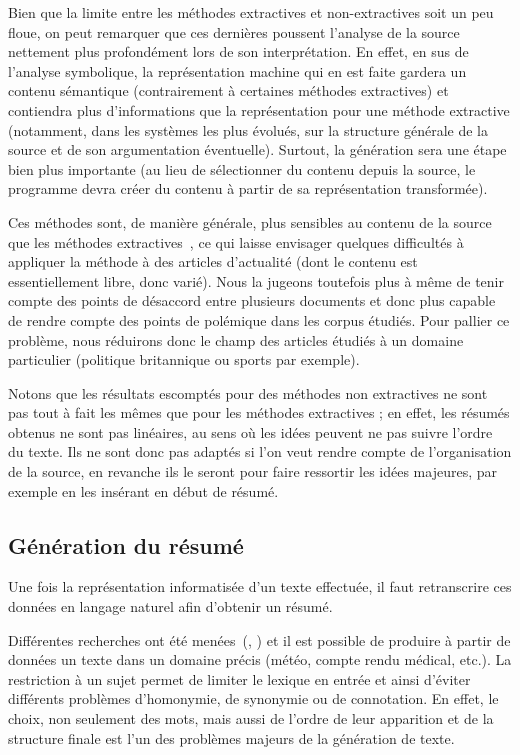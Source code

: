 \documentclass{article}           %
\begin{document}
Bien que la limite entre les méthodes extractives et non-extractives soit un peu floue, on peut remarquer que ces dernières poussent l'analyse de la source nettement plus profondément lors de son interprétation. En effet, en sus de l'analyse symbolique, la représentation machine qui en est faite gardera un contenu sémantique (contrairement à certaines méthodes extractives) et contiendra plus d'informations que la représentation pour une méthode extractive (notamment, dans les systèmes les plus évolués, sur la structure générale de la source et de son argumentation éventuelle). Surtout, la génération sera une étape bien plus importante (au lieu de sélectionner du contenu depuis la source, le programme devra créer du contenu à partir de sa représentation transformée).

Ces méthodes sont, de manière générale, plus sensibles au contenu de la source que les méthodes extractives~\cite[p.1774]{jones_automatic_2007}, ce qui laisse envisager quelques difficultés à appliquer la méthode à des articles d'actualité (dont le contenu est essentiellement libre, donc varié). Nous la jugeons toutefois plus à même de tenir compte des points de désaccord entre plusieurs documents et donc plus capable de rendre compte des points de polémique dans les corpus étudiés. Pour pallier ce problème, nous réduirons donc le champ des articles étudiés à un domaine particulier (politique britannique ou sports par exemple).

Notons que les résultats escomptés pour des méthodes non extractives ne sont pas tout à fait les mêmes que pour les méthodes extractives ; en effet, les résumés obtenus ne sont pas linéaires, au sens où les idées peuvent ne pas suivre l'ordre du texte. Ils ne sont donc pas adaptés si l'on veut rendre compte de l'organisation de la source, en revanche ils le seront pour faire ressortir les idées majeures, par exemple en les insérant en début de résumé.

\subsection{Génération du résumé}
Une fois la représentation informatisée d'un texte effectuée, il faut retranscrire ces données en langage naturel afin d'obtenir un résumé.

Différentes recherches ont été menées~(\cite{danlos_generation_2000}, \cite{horacek_building_2001}) et il est possible de produire à partir de données un texte dans un domaine précis (météo, compte rendu médical, etc.). La restriction à un sujet permet de limiter le lexique en entrée et ainsi d'éviter différents problèmes d'homonymie, de synonymie ou de connotation. En effet, le choix, non seulement des mots, mais aussi de l'ordre de leur apparition et de la structure finale est l'un des problèmes majeurs de la génération de texte.
\end{document}
